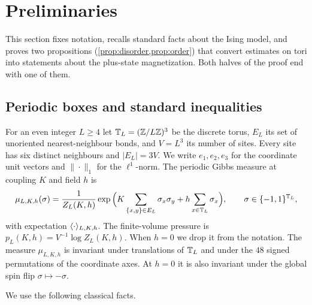 \section{Preliminaries}\label{sec:prelim}

This section fixes notation, recalls standard facts about the Ising model, and proves two propositions (\cref{prop:disorder,prop:order}) that convert estimates on tori into statements about the plus-state magnetization. Both halves of the proof end with one of them.

\subsection{Periodic boxes and standard inequalities}

For an even integer $L\ge4$ let $\mathbb T_L=(\mathbb Z/L\mathbb Z)^3$ be the discrete torus, $E_L$ its set of unoriented nearest-neighbour bonds, and $V=L^3$ its number of sites. Every site has six distinct neighbours and $|E_L|=3V$. We write $e_1,e_2,e_3$ for the coordinate unit vectors and $\|\cdot\|_1$ for the $\ell^1$-norm. The periodic Gibbs measure at coupling $K$ and field $h$ is
\[
 \mu_{L,K,h}(\sigma)=\frac{1}{Z_L(K,h)}\exp\Big(K\sum_{\{x,y\}\in E_L}\sigma_x\sigma_y+h\sum_{x\in\mathbb T_L}\sigma_x\Big),
 \qquad \sigma\in\{-1,1\}^{\mathbb T_L},
\]
with expectation $\langle \cdot\rangle_{L,K,h}$. The finite-volume pressure is $p_L(K,h)=V^{-1}\log Z_L(K,h)$. When $h=0$ we drop it from the notation. The measure $\mu_{L,K,h}$ is invariant under translations of $\mathbb T_L$ and under the $48$ signed permutations of the coordinate axes. At $h=0$ it is also invariant under the global spin flip $\sigma\mapsto-\sigma$.

We use the following classical facts.

